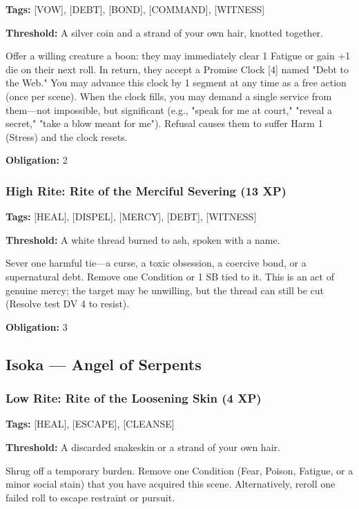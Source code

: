 \textbf{Tags:} [VOW], [DEBT], [BOND], [COMMAND], [WITNESS]

\textbf{Threshold:} A silver coin and a strand of your own hair, knotted together.

Offer a willing creature a boon: they may immediately clear 1 Fatigue or gain +1 die on their next roll. In return, they accept a Promise Clock [4] named "Debt to the Web." You may advance this clock by 1 segment at any time as a free action (once per scene). When the clock fills, you may demand a single service from them—not impossible, but significant (e.g., "speak for me at court," "reveal a secret," "take a blow meant for me"). Refusal causes them to suffer Harm 1 (Stress) and the clock resets.

\textbf{Obligation:} 2

\subsubsection{High Rite: Rite of the Merciful Severing (13 XP)}

\textbf{Tags:} [HEAL], [DISPEL], [MERCY], [DEBT], [WITNESS]

\textbf{Threshold:} A white thread burned to ash, spoken with a name.

Sever one harmful tie—a curse, a toxic obsession, a coercive bond, or a supernatural debt. Remove one Condition or 1 SB tied to it. This is an act of genuine mercy; the target may be unwilling, but the thread can still be cut (Resolve test DV 4 to resist).

\textbf{Obligation:} 3

\subsection{Isoka — Angel of Serpents}

\subsubsection{Low Rite: Rite of the Loosening Skin (4 XP)}

\textbf{Tags:} [HEAL], [ESCAPE], [CLEANSE]

\textbf{Threshold:} A discarded snakeskin or a strand of your own hair.

Shrug off a temporary burden. Remove one Condition (Fear, Poison, Fatigue, or a minor social stain) that you have acquired this scene. Alternatively, reroll one failed roll to escape restraint or pursuit.

